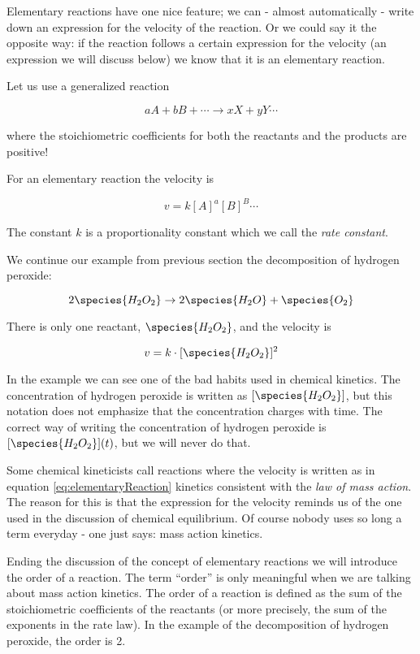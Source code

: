 Elementary reactions have one nice feature; we can - almost
automatically - write down an expression for the velocity of the
reaction. Or we could say it the opposite way: if the reaction follows
a certain expression for the velocity (an expression we will discuss
below) we know that it is an elementary reaction.

Let us use a generalized reaction \ie

\[
  aA + bB + \cdots \rightarrow xX + yY \cdots
\]

where the stoichiometric coefficients for both the reactants and the
products are positive!

For an elementary reaction the velocity is

\begin{equation}
  \label{eq:elementaryReaction}
  v = k[A]^a[B]^B\cdots
\end{equation}

The constant $k$ is a proportionality constant which we call the
\textit{rate constant}.

\begin{example}
  We continue our example from previous section \ie the decomposition of hydrogen peroxide:

  \begin{equation}
    \label{eq:decompH2O2}
    2\species{H_2O_2} \rightarrow 2\species{H_2O} + \species{O_2}
  \end{equation}

  There is only one reactant, $\species{H_2O_2}$, and the velocity is

  \begin{equation}
    \label{eq:decompH2O2velocity}
    v = k\cdot [\species{H_2O_2}]^2
  \end{equation}
\end{example}

In the example we can see one of the bad habits used in chemical
kinetics. The concentration of hydrogen peroxide is written as
$[\species{H_2O_2}]$, but this notation does not emphasize that the
concentration charges with time. The correct way of writing the
concentration of hydrogen peroxide is $[\species{H_2O_2}](t)$, but we will
never do that.

Some chemical kineticists call reactions where the velocity is written
as in equation \ref{eq:elementaryReaction} kinetics consistent with
the \textit{law of mass action}. The reason for this is that the
expression for the velocity reminds us of the one used in the
discussion of chemical equilibrium. Of course nobody uses so long a
term everyday - one just says: mass action kinetics.

Ending the discussion of the concept of elementary reactions we will
introduce the order of a reaction. The term ``order'' is only
meaningful when we are talking about mass action kinetics. The order
of a reaction is defined as the sum of the stoichiometric coefficients
of the reactants (or more precisely, the sum of the exponents in the
rate law). In the example of the decomposition of hydrogen peroxide,
the order is 2.
